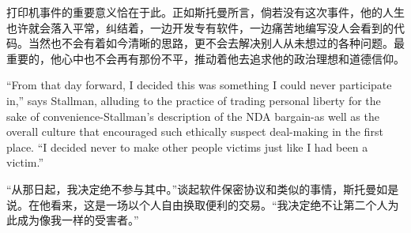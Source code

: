 \ifdefined\chs
打印机事件的重要意义恰在于此。正如斯托曼所言，倘若没有这次事件，他的人生也许就会落入平常，纠结着，一边开发专有软件，一边痛苦地编写没人会看到的代码。当然也不会有着如今清晰的思路，更不会去解决别人从未想过的各种问题。最重要的，他心中也不会再有那份不平，推动着他去追求他的政治理想和道德信仰。
\fi

\ifdefined\eng
``From that day forward, I decided this was something I could never participate in,'' says Stallman, alluding to the practice of trading personal liberty for the sake of convenience-Stallman's description of the NDA bargain-as well as the overall culture that encouraged such ethically suspect deal-making in the first place. ``I decided never to make other people victims just like I had been a victim.''
\fi

\ifdefined\chs
``从那日起，我决定绝不参与其中。''谈起软件保密协议和类似的事情，斯托曼如是说。在他看来，这是一场以个人自由换取便利的交易。``我决定绝不让第二个人为此成为像我一样的受害者。''
\fi

\theendnotes
\setcounter{endnote}{0}
